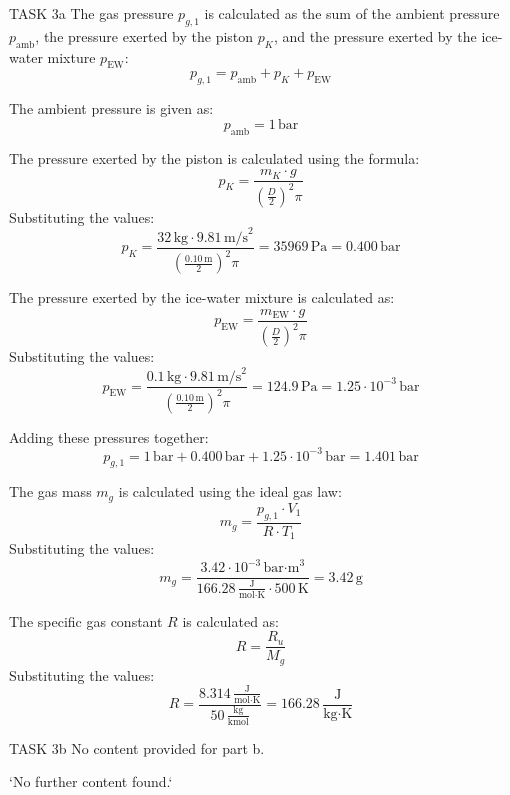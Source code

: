 TASK 3a  
The gas pressure \( p_{g,1} \) is calculated as the sum of the ambient pressure \( p_{\text{amb}} \), the pressure exerted by the piston \( p_K \), and the pressure exerted by the ice-water mixture \( p_{\text{EW}} \):  
\[
p_{g,1} = p_{\text{amb}} + p_K + p_{\text{EW}}
\]  

The ambient pressure is given as:  
\[
p_{\text{amb}} = 1 \, \text{bar}
\]  

The pressure exerted by the piston is calculated using the formula:  
\[
p_K = \frac{m_K \cdot g}{\left(\frac{D}{2}\right)^2 \pi}
\]  
Substituting the values:  
\[
p_K = \frac{32 \, \text{kg} \cdot 9.81 \, \text{m/s}^2}{\left(\frac{0.10 \, \text{m}}{2}\right)^2 \pi} = 35969 \, \text{Pa} = 0.400 \, \text{bar}
\]  

The pressure exerted by the ice-water mixture is calculated as:  
\[
p_{\text{EW}} = \frac{m_{\text{EW}} \cdot g}{\left(\frac{D}{2}\right)^2 \pi}
\]  
Substituting the values:  
\[
p_{\text{EW}} = \frac{0.1 \, \text{kg} \cdot 9.81 \, \text{m/s}^2}{\left(\frac{0.10 \, \text{m}}{2}\right)^2 \pi} = 124.9 \, \text{Pa} = 1.25 \cdot 10^{-3} \, \text{bar}
\]  

Adding these pressures together:  
\[
p_{g,1} = 1 \, \text{bar} + 0.400 \, \text{bar} + 1.25 \cdot 10^{-3} \, \text{bar} = 1.401 \, \text{bar}
\]  

The gas mass \( m_g \) is calculated using the ideal gas law:  
\[
m_g = \frac{p_{g,1} \cdot V_1}{R \cdot T_1}
\]  
Substituting the values:  
\[
m_g = \frac{3.42 \cdot 10^{-3} \, \text{bar·m}^3}{166.28 \, \frac{\text{J}}{\text{mol·K}} \cdot 500 \, \text{K}} = 3.42 \, \text{g}
\]  

The specific gas constant \( R \) is calculated as:  
\[
R = \frac{R_u}{M_g}
\]  
Substituting the values:  
\[
R = \frac{8.314 \, \frac{\text{J}}{\text{mol·K}}}{50 \, \frac{\text{kg}}{\text{kmol}}} = 166.28 \, \frac{\text{J}}{\text{kg·K}}
\]  

TASK 3b  
No content provided for part b.  

`No further content found.`